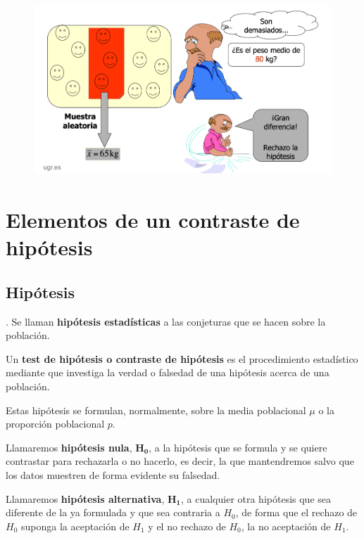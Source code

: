 	
	

\begin{figure}[H]
	\centering
	\includegraphics[width=1\textwidth]{imagenes/imagenes06/T06IM01.png}
	\end{figure}
	
	
\section{Elementos de un contraste de hipótesis}

\subsection{Hipótesis}

\begin{definition}
.	Se llaman \textbf{hipótesis estadísticas} a las conjeturas que se hacen sobre la población.

\vspace{2mm} Un \textbf{test de hipótesis o contraste de hipótesis} es el procedimiento estadístico mediante que investiga la verdad o falsedad de una hipótesis acerca de una población. 

\vspace{2mm} Estas hipótesis se formulan, normalmente, sobre la media poblacional $\mu$ o la proporción poblacional $p$. 

\vspace{2mm} Llamaremos \textbf{hipótesis nula}, $\boldsymbol{H_0}$,  a la hipótesis que se formula y se quiere contrastar para  rechazarla o no hacerlo, es decir, la que mantendremos salvo que los datos muestren de forma evidente su falsedad.

\vspace{2mm} Llamaremos \textbf{hipótesis alternativa}, $\boldsymbol{H_1}$, a cualquier otra hipótesis que sea diferente de la ya formulada y que sea contraria a $H_0$, de forma que el rechazo de $H_0$ suponga la aceptación de $H_1$ y el no rechazo de $H_0$, la no aceptación de $H_1$. 
\end{definition}


